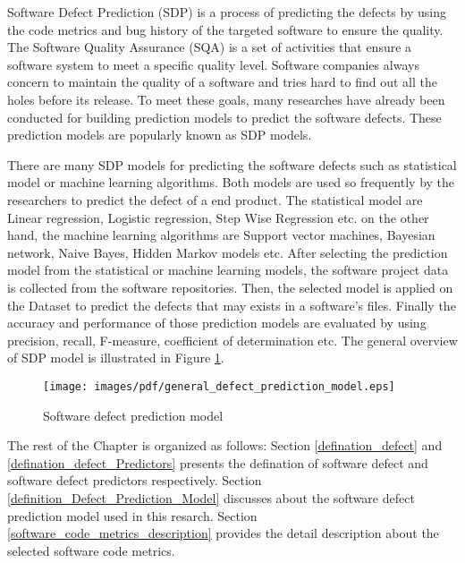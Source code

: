 \documentclass[12pt]{report}
\begin{document}
Software Defect Prediction (SDP) is a process of predicting the defects by using the code metrics and bug history of the targeted software to ensure the quality. The Software Quality Assurance (SQA) is a set of activities that ensure a software system to meet a specific quality level. Software companies always concern to maintain the quality of a software and tries hard to find out all the holes before its release. To meet these goals, many researches have already been conducted for building prediction models to predict the software defects. These prediction models are popularly known as SDP models.

%
There are many SDP models for predicting the software defects such as statistical model or machine learning algorithms. Both models are used so frequently by the researchers to predict the defect of a end product. The statistical model are Linear regression, Logistic regression, Step Wise Regression etc. on the other hand, the machine learning algorithms are Support vector machines, Bayesian network, Naive Bayes, Hidden Markov models etc.
After selecting the prediction model from the statistical or machine learning models, the software project data is collected from the software repositories. Then, the selected model is applied on the Dataset to predict the defects that may exists in a software's files. Finally the accuracy and performance of those prediction models are evaluated by using precision, recall, F-measure, coefficient of determination etc. The general overview of SDP model is illustrated in Figure \ref{generalized_Defect_Prediction_Model}. 
\begin{figure}[h!]
\center
      \texttt{[image: images/pdf/general\_defect\_prediction\_model.eps]}
		\caption{Software defect prediction model}
		\label{generalized_Defect_Prediction_Model}	
\end{figure}
The rest of the Chapter is organized as follows: Section \ref{defination_defect} and \ref{defination_defect_Predictors} presents the defination of software defect and software defect predictors respectively. Section \ref{definition_Defect_Prediction_Model} discusses about the software defect prediction model used in this resarch. Section \ref{software_code_metrics_description} provides the detail description about the selected software code metrics.  
\end{document}
